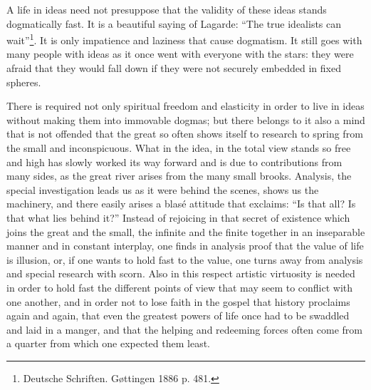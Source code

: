 \documentclass[12pt,a4paper,openany]{book}
\newcommand{\opage}[1]{\marginnote{\footnotesize\textit{[#1]}}}
\begin{document}
A life in ideas need not presuppose that the validity
of these ideas stands dogmatically fast. It is a beautiful
\opage{186}saying of Lagarde: ``The true idealists can wait''\footnote{Deutsche Schriften. Gøttingen 1886 p. 481.}. It
is only impatience and laziness that cause dogmatism.
It still goes with many people with ideas as it once
went with everyone with the stars: they were afraid that they
would fall down if they were not securely embedded in fixed
spheres.

There is required not only spiritual freedom and elasticity
in order to live in ideas without making them into immovable dogmas;
but there belongs to it also a mind that is not offended
that the great so often shows itself to research to spring
from the small and inconspicuous. What in the idea, in
the total view stands so free and high has slowly worked its way
forward and is due to contributions from many sides, as the great river
arises from the many small brooks. Analysis, the special
investigation leads us as it were behind the scenes, shows us the
machinery, and there easily arises a blasé attitude that exclaims:
``Is that all? Is that what lies behind it?'' Instead
of rejoicing in that secret of existence which
joins the great and the small, the infinite and the
finite together in an inseparable manner and in constant interplay,
one finds in analysis proof that the value of life is illusion,
or, if one wants to hold fast to the value, one turns away from
analysis and special research with scorn. Also in this
respect artistic virtuosity is needed in order to hold fast the
different points of view that may seem to conflict with one another,
and in order not to lose faith in the gospel that history
proclaims again and again, that even the greatest powers of life
once had to be swaddled and laid in a manger, and that the helping
and redeeming forces often come from a quarter from which
one expected them least.
\end{document}

